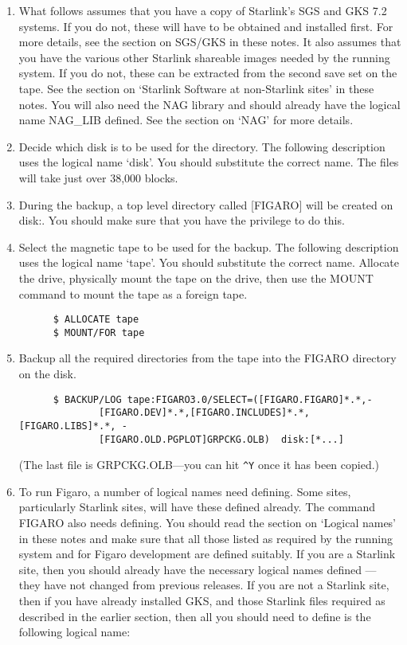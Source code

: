 \begin{enumerate}

\item What follows assumes that you have a copy of  Starlink's  SGS and  GKS
7.2  systems.  If you do not, these will have to be obtained and installed
first. For  more  details,  see  the section  on SGS/GKS in these notes.  It
also assumes that you have the various other Starlink shareable  images  needed
by the  running  system. If you do not, these can be extracted from the second
save set on the tape. See  the  section  on `Starlink  Software  at
non-Starlink  sites' in these notes. You will also need the NAG library and
should  already  have the  logical  name NAG\_LIB defined.  See the section on
`NAG' for more details.

\item Decide which disk is to  be  used  for  the  directory. The following
description  uses  the  logical  name `disk'.  You should substitute the
correct name.  The files will take just over 38,000 blocks.

\item During the backup, a top level directory called [FIGARO] will be  created
on disk:.  You should make sure that you have the privilege to do this.

\item Select the magnetic tape to be  used  for  the  backup. The following
description  uses  the  logical  name `tape'.  You should substitute the
correct  name. Allocate  the  drive, physically  mount  the  tape on the
drive, then use the MOUNT command to mount the tape as a foreign tape.

\begin{verbatim}
      $ ALLOCATE tape
      $ MOUNT/FOR tape
\end{verbatim}

\item Backup all the required directories from the  tape  into  the FIGARO
directory on the disk.

\begin{verbatim}
      $ BACKUP/LOG tape:FIGARO3.0/SELECT=([FIGARO.FIGARO]*.*,-
              [FIGARO.DEV]*.*,[FIGARO.INCLUDES]*.*,[FIGARO.LIBS]*.*, -
              [FIGARO.OLD.PGPLOT]GRPCKG.OLB)  disk:[*...]
\end{verbatim}

(The last file is GRPCKG.OLB---you can hit \verb+^Y+ once it has been copied.)

\item To run Figaro, a number of logical names need defining.  Some sites,
particularly  Starlink sites, will have these defined already.  The command
FIGARO also needs defining.  You should read  the  section on `Logical names'
in these notes and make sure that all those listed as required by the running
system and  for Figaro development are defined suitably.  If you are a Starlink
site, then you should already have  the  necessary logical  names  defined ---
they have not changed from previous releases.  If you are not a Starlink site,
then if  you  have already  installed  GKS, and those Starlink files required
as described in the earlier section, then all you should need to define is the
following logical name:


\end{enumerate}
